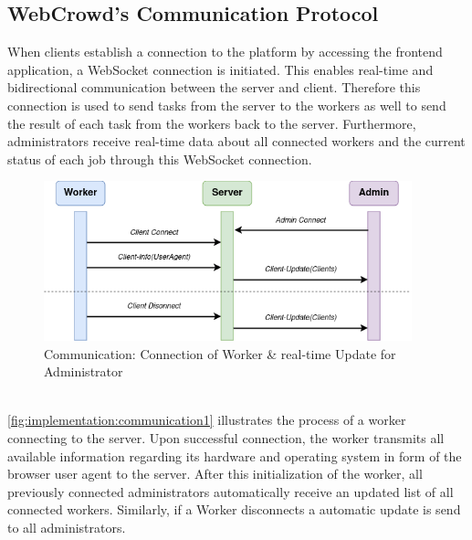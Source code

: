 \subsection{WebCrowd's Communication Protocol}
\label{subsec:implementation:architecture:communication}
When clients establish a connection to the platform by accessing the frontend application, a WebSocket connection is initiated. This enables real-time and bidirectional communication between the server and client. Therefore this connection is used to send tasks from the server to the workers as well to send the result of each task from the workers back to the server. Furthermore, administrators receive real-time data about all connected workers and the current status of each job through this WebSocket connection.
\begin{figure}[htbp]
    \centering
    \includegraphics[width=0.95\textwidth]{gfx/figures/communication-connection.png}
    \caption{Communication: Connection of Worker \& real-time Update for Administrator}
    \label{fig:implementation:communication1}
\end{figure}
~\\
\autoref{fig:implementation:communication1} illustrates the process of a worker connecting to the server. Upon successful connection, the worker transmits all available information regarding its hardware and operating system in form of the browser user agent to the server. After this initialization of the worker, all previously connected administrators automatically receive an updated list of all connected workers. Similarly, if a Worker disconnects a automatic update is send to all administrators.
